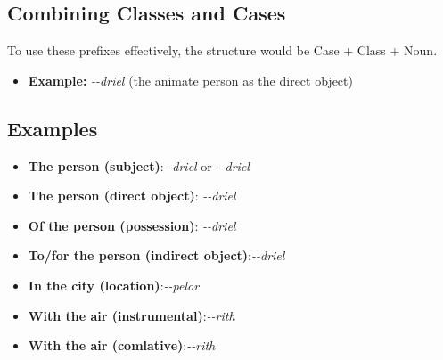 \documentclass[letterpaper,twocolumn,openany,nodeprecatedcode,hidelinks]{dndbook}
\begin{document}
{\begin{itemize}
\begin{itemize}
\end{itemize}


\subsection*{Combining Classes and Cases}
To use these prefixes effectively, the structure would be Case + Class + Noun.
\begin{itemize}
    \item \textbf{Example:} \textit{\CAacc-\Clan-driel} (the animate person as the direct object)
\end{itemize}

\subsection*{Examples}
\begin{itemize}
    \item \textbf{The person (subject)}: \newline \textit{\CLan-driel} or \textit{\CAnom-\CLan-driel}
    \item \textbf{The person (direct object)}: \newline \textit{\CAacc-\CLan-driel}
    \item \textbf{Of the person (possession)}: \newline \textit{\CAgen-\CLan-driel}
    \item \textbf{To/for the person (indirect object)}:\newline  \textit{\CAdat-\CLan-driel}
    \item \textbf{In the city (location)}:\newline  \textit{\CAloc-\CLin-pelor}
    \item \textbf{With the air (instrumental)}:\newline  \textit{\CAins-\CLin-rith}
        \item \textbf{With the air (comlative)}:\newline  \textit{\CAcom-\CLin-rith}
\end{itemize}

}
\end{document}
